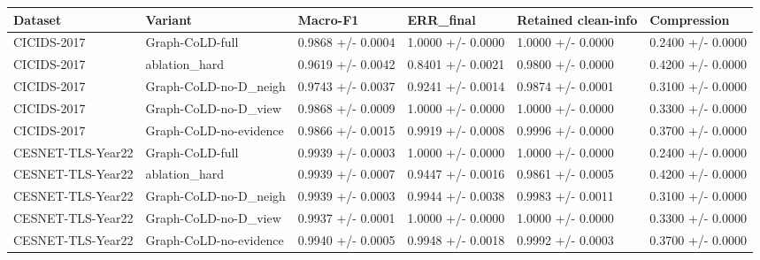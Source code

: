 \small
\begin{tabular}{llllll}
\hline
Dataset & Variant & Macro-F1 & ERR\_final & Retained clean-info & Compression \\
\hline
CICIDS-2017 & Graph-CoLD-full & 0.9868 +/- 0.0004 & 1.0000 +/- 0.0000 & 1.0000 +/- 0.0000 & 0.2400 +/- 0.0000 \\
CICIDS-2017 & ablation\_hard & 0.9619 +/- 0.0042 & 0.8401 +/- 0.0021 & 0.9800 +/- 0.0000 & 0.4200 +/- 0.0000 \\
CICIDS-2017 & Graph-CoLD-no-D\_neigh & 0.9743 +/- 0.0037 & 0.9241 +/- 0.0014 & 0.9874 +/- 0.0001 & 0.3100 +/- 0.0000 \\
CICIDS-2017 & Graph-CoLD-no-D\_view & 0.9868 +/- 0.0009 & 1.0000 +/- 0.0000 & 1.0000 +/- 0.0000 & 0.3300 +/- 0.0000 \\
CICIDS-2017 & Graph-CoLD-no-evidence & 0.9866 +/- 0.0015 & 0.9919 +/- 0.0008 & 0.9996 +/- 0.0000 & 0.3700 +/- 0.0000 \\
CESNET-TLS-Year22 & Graph-CoLD-full & 0.9939 +/- 0.0003 & 1.0000 +/- 0.0000 & 1.0000 +/- 0.0000 & 0.2400 +/- 0.0000 \\
CESNET-TLS-Year22 & ablation\_hard & 0.9939 +/- 0.0007 & 0.9447 +/- 0.0016 & 0.9861 +/- 0.0005 & 0.4200 +/- 0.0000 \\
CESNET-TLS-Year22 & Graph-CoLD-no-D\_neigh & 0.9939 +/- 0.0003 & 0.9944 +/- 0.0038 & 0.9983 +/- 0.0011 & 0.3100 +/- 0.0000 \\
CESNET-TLS-Year22 & Graph-CoLD-no-D\_view & 0.9937 +/- 0.0001 & 1.0000 +/- 0.0000 & 1.0000 +/- 0.0000 & 0.3300 +/- 0.0000 \\
CESNET-TLS-Year22 & Graph-CoLD-no-evidence & 0.9940 +/- 0.0005 & 0.9948 +/- 0.0018 & 0.9992 +/- 0.0003 & 0.3700 +/- 0.0000 \\
\hline
\end{tabular}
